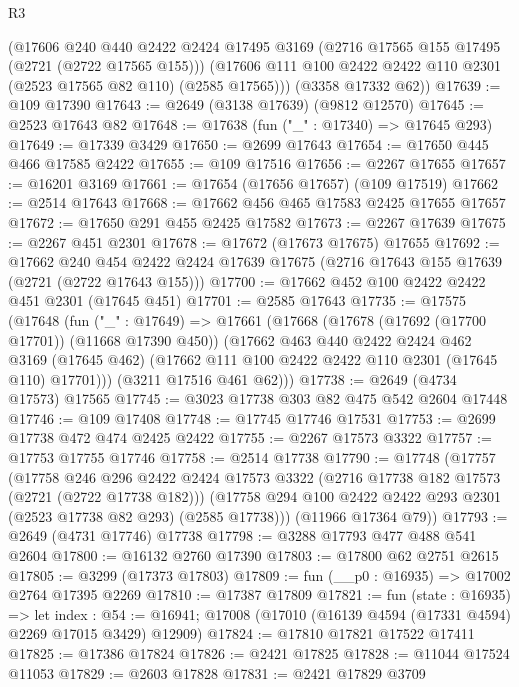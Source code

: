 \begin{lexlean}{R3}
\begin{coremodule}
      (@17606
        @240
        @440
        @2422
        @2424
        @17495
        @3169
        (@2716 @17565 @155 @17495 (@2721 (@2722 @17565 @155)))
        (@17606 @111 @100 @2422 @2422 @110 @2301 (@2523 @17565 @82 @110) (@2585 @17565)))
      (@3358 @17332 @62))
@17639 := @109 @17390
@17643 := @2649 (@3138 @17639) (@9812 @12570)
@17645 := @2523 @17643 @82
@17648 := @17638 (fun ("_" : @17340) => @17645 @293)
@17649 := @17339 @3429
@17650 := @2699 @17643
@17654 := @17650 @445 @466 @17585 @2422
@17655 := @109 @17516
@17656 := @2267 @17655
@17657 := @16201 @3169
@17661 := @17654 (@17656 @17657) (@109 @17519)
@17662 := @2514 @17643
@17668 := @17662 @456 @465 @17583 @2425 @17655 @17657
@17672 := @17650 @291 @455 @2425 @17582
@17673 := @2267 @17639
@17675 := @2267 @451 @2301
@17678 := @17672 (@17673 @17675) @17655
@17692 := @17662
    @240
    @454
    @2422
    @2424
    @17639
    @17675
    (@2716 @17643 @155 @17639 (@2721 (@2722 @17643 @155)))
@17700 := @17662 @452 @100 @2422 @2422 @451 @2301 (@17645 @451)
@17701 := @2585 @17643
@17735 := @17575
    (@17648
      (fun ("_" : @17649) =>
      @17661
        (@17668
          (@17678 (@17692 (@17700 @17701)) (@11668 @17390 @450))
          (@17662
            @463
            @440
            @2422
            @2424
            @462
            @3169
            (@17645 @462)
            (@17662 @111 @100 @2422 @2422 @110 @2301 (@17645 @110) @17701)))
        (@3211 @17516 @461 @62)))
@17738 := @2649 (@4734 @17573) @17565
@17745 := @3023 @17738 @303 @82 @475 @542 @2604 @17448
@17746 := @109 @17408
@17748 := @17745 @17746 @17531
@17753 := @2699 @17738 @472 @474 @2425 @2422
@17755 := @2267 @17573 @3322
@17757 := @17753 @17755 @17746
@17758 := @2514 @17738
@17790 := @17748
    (@17757
      (@17758
        @246
        @296
        @2422
        @2424
        @17573
        @3322
        (@2716 @17738 @182 @17573 (@2721 (@2722 @17738 @182)))
        (@17758 @294 @100 @2422 @2422 @293 @2301 (@2523 @17738 @82 @293) (@2585 @17738)))
      (@11966 @17364 @79))
@17793 := @2649 (@4731 @17746) @17738
@17798 := @3288 @17793 @477 @488 @541 @2604
@17800 := @16132 @2760 @17390
@17803 := @17800 @62 @2751 @2615
@17805 := @3299 (@17373 @17803)
@17809 := fun (__p0 : @16935) => @17002 @2764 @17395 @2269
@17810 := @17387 @17809
@17821 := fun (state : @16935) =>
  let index : @54 := @16941; @17008 (@17010 (@16139 @4594 (@17331 @4594) @2269 @17015 @3429) @12909)
@17824 := @17810 @17821 @17522 @17411
@17825 := @17386 @17824
@17826 := @2421 @17825
@17828 := @11044 @17524 @11053
@17829 := @2603 @17828
@17831 := @2421 @17829 @3709

\end{coremodule}
\end{lexlean}
